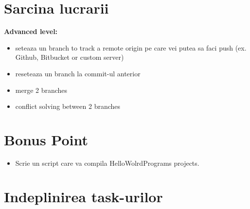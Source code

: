 \documentclass[12pt]{article}
\begin{document}
\section* {Sarcina lucrarii}
\textbf{Advanced level:}
\begin{itemize}
\item seteaza un branch to track a remote origin pe care vei putea sa faci push (ex. Github, Bitbucket or custom server)
\item reseteaza un branch la commit-ul anterior
\item 	merge 2 branches
\item 	conflict solving between 2 branches
\end{itemize}

\section *{Bonus Point}
\begin{itemize}
\item Scrie un script care va compila HelloWolrdPrograms projects.	
\end{itemize}
\section {Indeplinirea task-urilor}
\end{document}
